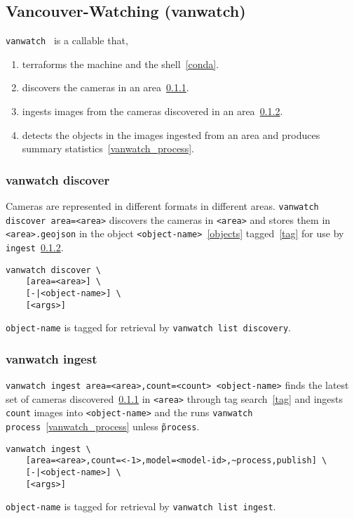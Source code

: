 \subsection{Vancouver-Watching (vanwatch)}
\label{vanwatch}

\texttt{vanwatch}~ is a callable that,
%
\begin{enumerate}
    \item{terraforms the machine and the shell~\ref{conda}.}
    \item{discovers the cameras in an area~\ref{vanwatch_discover}.}
    \item{ingests images from the cameras discovered in an area~\ref{vanwatch_ingest}.}
    \item{detects the objects in the images ingested from an area and produces summary statistics~\ref{vanwatch_process}.}
\end{enumerate}

\subsubsection{vanwatch discover}
\label{vanwatch_discover}

Cameras are represented in different formats in different areas. \texttt{vanwatch discover area=<area>} discovers the cameras in \texttt{<area>} and stores them in \texttt{<area>.geojson} in the object \texttt{<object-name>}~\ref{objects} tagged~\ref{tag} for use by \texttt{ingest}~\ref{vanwatch_ingest}.
%
\begin{verbatim}
vanwatch discover \
    [area=<area>] \
    [-|<object-name>] \
    [<args>]
\end{verbatim}
%
\texttt{object-name} is tagged for retrieval by \texttt{vanwatch list discovery}. 

\subsubsection{vanwatch ingest}
\label{vanwatch_ingest}

\texttt{vanwatch ingest area=<area>,count=<count> <object-name>} finds the latest set of cameras discovered~\ref{vanwatch_discover} in \texttt{<area>} through tag search~\ref{tag} and ingests \texttt{count} images into \texttt{<object-name>} and the runs \texttt{vanwatch process}~\ref{vanwatch_process} unless \texttt{\~process}.
%
\begin{verbatim}
vanwatch ingest \
    [area=<area>,count=<-1>,model=<model-id>,~process,publish] \
    [-|<object-name>] \
    [<args>]
\end{verbatim}
%
\texttt{object-name} is tagged for retrieval by \texttt{vanwatch list ingest}. 

